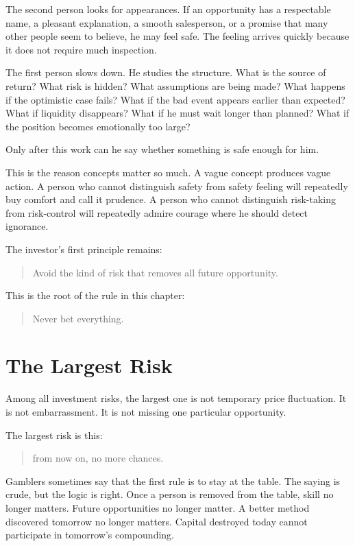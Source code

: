 The second person looks for appearances. If an opportunity has a respectable name, a pleasant explanation, a smooth salesperson, or a promise that many other people seem to believe, he may feel safe. The feeling arrives quickly because it does not require much inspection.

The first person slows down. He studies the structure. What is the source of return? What risk is hidden? What assumptions are being made? What happens if the optimistic case fails? What if the bad event appears earlier than expected? What if liquidity disappears? What if he must wait longer than planned? What if the position becomes emotionally too large?

Only after this work can he say whether something is safe enough for him.

This is the reason concepts matter so much. A vague concept produces vague action. A person who cannot distinguish safety from safety feeling will repeatedly buy comfort and call it prudence. A person who cannot distinguish risk-taking from risk-control will repeatedly admire courage where he should detect ignorance.

The investor's first principle remains:

\begin{quote}
Avoid the kind of risk that removes all future opportunity.
\end{quote}

This is the root of the rule in this chapter:

\begin{quote}
Never bet everything.
\end{quote}

\section*{The Largest Risk}

Among all investment risks, the largest one is not temporary price fluctuation. It is not embarrassment. It is not missing one particular opportunity.

The largest risk is this:

\begin{quote}
from now on, no more chances.
\end{quote}

Gamblers sometimes say that the first rule is to stay at the table. The saying is crude, but the logic is right. Once a person is removed from the table, skill no longer matters. Future opportunities no longer matter. A better method discovered tomorrow no longer matters. Capital destroyed today cannot participate in tomorrow's compounding.

